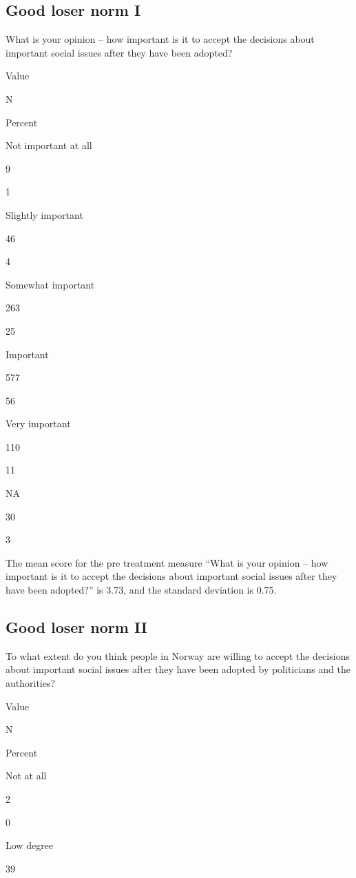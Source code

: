 \documentclass[
]{book}
\begin{document}
\hypertarget{good-loser-norm-i}{%
\subsection{Good loser norm I}\label{good-loser-norm-i}}

What is your opinion -- how important is it to accept the decisions
about important social issues after they have been adopted?

Value

N

Percent

Not important at all

9

1

Slightly important

46

4

Somewhat important

263

25

Important

577

56

Very important

110

11

NA

30

3

The mean score for the pre treatment measure ``What is your opinion --
how important is it to accept the decisions about important social
issues after they have been adopted?'' is 3.73, and the standard
deviation is 0.75.

\hypertarget{good-loser-norm-ii}{%
\subsection{Good loser norm II}\label{good-loser-norm-ii}}

To what extent do you think people in Norway are willing to accept the
decisions about important social issues after they have been adopted by
politicians and the authorities?

Value

N

Percent

Not at all

2

0

Low degree

39
\end{document}
